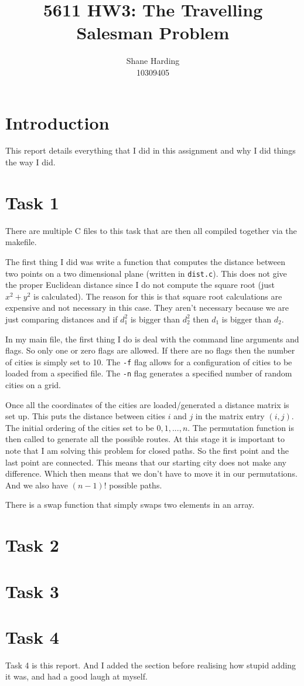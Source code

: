 \documentclass{article}
\begin{document}
\title{5611 HW3: The Travelling Salesman Problem}
\author{Shane Harding \\ 10309405}

\maketitle

\section{Introduction}

This report details everything that I did in this assignment and why I did things the way I did.

\section{Task 1}

There are multiple C files to this task that are then all compiled together via the makefile.

The first thing I did was write a function that computes the distance between two points on a two dimensional plane (written in \verb!dist.c!). This does not give the proper Euclidean distance since I do not compute the square root (just $x^2 + y^2$ is calculated). The reason for this is that square root calculations are expensive and not necessary in this case. They aren't necessary because we are just comparing distances and if $d_1^2$ is bigger than $d_2^2$ then $d_1$ is bigger than $d_2$.

In my main file, the first thing I do is deal with the command line arguments and flags. So only one or zero flags are allowed. If there are no flags then the number of cities is simply set to 10. The \verb!-f! flag allows for a configuration of cities to be loaded from a specified file. The \verb!-n! flag generates a specified number of random cities on a grid.

Once all the coordinates of the cities are loaded/generated a distance matrix is set up. This puts the distance between cities $i$ and $j$ in the matrix entry $(i,j)$. The initial ordering of the cities set to be $0,1,...,n$. The permutation function is then called to generate all the possible routes. At this stage it is important to note that I am solving this problem for closed paths. So the first point and the last point are connected. This means that our starting city does not make any difference. Which then means that we don't have to move it in our permutations. And we also have $(n-1)!$ possible paths.

There is a swap function that simply swaps two elements in an array.

\section{Task 2}

\section{Task 3}


\section{Task 4}
Task 4 is this report. And I added the section before realising how stupid adding it was, and had a good laugh at myself.
\end{document}

